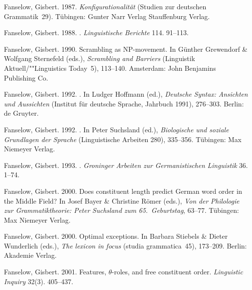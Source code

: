 \begin{thebibliography}{1420}
Fanselow, Gisbert. 1987.
\newblock \emph{Konfigurationalit{\"a}t} (Studien zur deutschen Grammatik~29).
\newblock T{\"u}bingen: \original Gunter Narr Verlag \jetzt Stauffenburg
  Verlag.

Fanselow, Gisbert. 1988.
.
\newblock \emph{Linguistische Berichte} 114. 91--113.

Fanselow, Gisbert. 1990.
\newblock Scrambling as {NP}-movement.
\newblock In G{\"u}nther Grewendorf \& Wolfgang Sternefeld (eds.),
  \emph{{Scrambling and Barriers}} (Linguistik Aktuell/""Linguistics Today~5),
  113--140. Amsterdam: John Benjamins Publishing Co.

Fanselow, Gisbert. 1992{}.
.
\newblock In Ludger Hoffmann (ed.), \emph{{Deutsche Syntax: Ansichten und
  Aussichten}}  (Institut f{\"u}r deutsche Sprache, Jahrbuch 1991), 276--303.
  Berlin: de Gruyter.

Fanselow, Gisbert. 1992{}.
.
\newblock In Peter Suchsland (ed.), \emph{{Biologische und soziale Grundlagen
  der Sprache}} (Linguistische Arbeiten 280), 335--356. T{\"u}bingen: Max
  Niemeyer Verlag.

Fanselow, Gisbert. 1993.
.
\newblock \emph{Groninger Arbeiten zur Germanistischen Linguistik} 36. 1--74.

Fanselow, Gisbert. 2000{}.
\newblock Does constituent length predict {German} word order in the {Middle
  Field}?
\newblock In Josef Bayer \& Christine R{\"o}mer (eds.), \emph{{Von der
  Philologie zur Grammatiktheorie: Peter Suchsland zum 65.\ Geburtstag}},
  63--77. T{\"u}bingen: Max Niemeyer Verlag.

Fanselow, Gisbert. 2000{}.
\newblock Optimal exceptions.
\newblock In Barbara Stiebels \& Dieter Wunderlich (eds.), \emph{The lexicon in
  focus} (studia grammatica~45), 173--209. Berlin: Akademie Verlag.

Fanselow, Gisbert. 2001.
\newblock Features, $\theta$-roles, and free constituent order.
\newblock \emph{Linguistic Inquiry} 32(3). 405--437.


\end{thebibliography}
